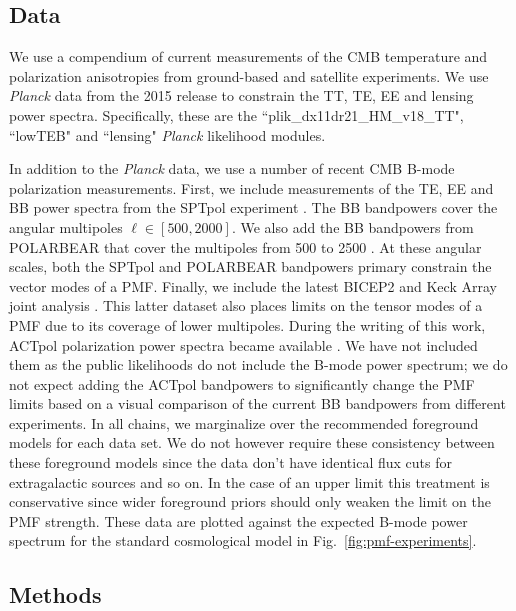 \documentclass[apj]{emulateapj}
\newcommand{\planck}{{\sl Planck}}
\newcommand{\pb}{POLARBEAR}
\newcommand{\sptpol}{SPTpol}
\begin{document}
\subsection{Data}

We use a compendium of current measurements of the CMB temperature and polarization anisotropies from ground-based and satellite experiments. 
We use \planck{} data from the 2015 release to constrain the TT, TE, EE and lensing power spectra. 
Specifically, these are the ``plik\_dx11dr21\_HM\_v18\_TT", ``lowTEB" and ``lensing" \planck{} likelihood modules. 


In addition to the \planck{} data, we use a number of recent CMB B-mode polarization measurements. 
First, we include measurements of the TE, EE and BB power spectra from the \sptpol{} experiment \citep{crites15,keisler15}. 
The BB bandpowers cover the angular multipoles $\ell \in [500,2000]$. 
We also add the BB bandpowers from \pb{} that cover the multipoles from 500 to 2500 \citep{polarbear14b}. 
At these angular scales, both the \sptpol{} and \pb{} bandpowers primary constrain the vector modes of a PMF. 
Finally, we include the latest BICEP2 and Keck Array  joint analysis \citep{bicepkeck15}. 
This latter dataset also places limits on the tensor modes of a PMF due to its coverage of lower multipoles. 
During the writing of this work, ACTpol polarization power spectra became available \citep{naess14,louis16}. 
We have not included them as the public likelihoods do not include the B-mode power spectrum; we do not expect adding the ACTpol bandpowers to significantly change the PMF limits based on a visual comparison of the current BB bandpowers from different experiments.
In all chains, we marginalize over the recommended foreground models for each data set. 
We do not however require these consistency between these foreground models since the data don't have identical flux cuts for extragalactic sources and so on. 
In the case of an upper limit this treatment is conservative since wider foreground priors should only weaken the limit on the PMF strength. 
These data are plotted against the expected B-mode power spectrum for the standard cosmological model in Fig.~\ref{fig:pmf-experiments}. 

\subsection{Methods}
\end{document}
